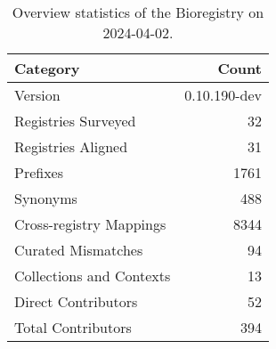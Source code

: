 \begin{table}
\caption{Overview statistics of the Bioregistry on 2024-04-02.}
\label{tab:bioregistry-summary}
\begin{tabular}{lr}
\toprule
Category & Count \\
\midrule
Version & 0.10.190-dev \\
Registries Surveyed & 32 \\
Registries Aligned & 31 \\
Prefixes & 1761 \\
Synonyms & 488 \\
Cross-registry Mappings & 8344 \\
Curated Mismatches & 94 \\
Collections and Contexts & 13 \\
Direct Contributors & 52 \\
Total Contributors & 394 \\
\bottomrule
\end{tabular}
\end{table}
